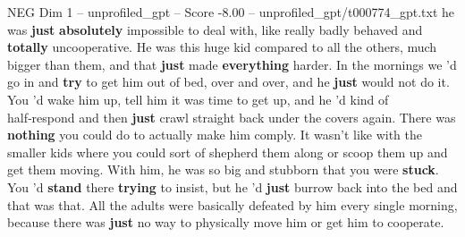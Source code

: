 \begin{textsample}{NEG Dim 1 – unprofiled\_gpt – Score -8.00 – unprofiled\_gpt/t000774\_gpt.txt}  \label{ex:f1_neg_027}
he was \textbf{just} \textbf{absolutely} impossible to deal with, like really badly behaved and \textbf{totally} uncooperative.
He was this huge kid compared to all the others, much bigger than them, and that \textbf{just} made \textbf{everything} harder.
In the mornings we ’d go in and \textbf{try} to get him out of bed, over and over, and he \textbf{just} would not do it.
You ’d wake him up, tell him it was time to get up, and he ’d kind of half‑respond and then \textbf{just} crawl straight back under the covers again.
There was \textbf{nothing} you could do to actually make him comply.
It wasn't like with the smaller kids where you could sort of shepherd them along or scoop them up and get them moving.
With him, he was so big and stubborn that you were \textbf{stuck}.
You ’d \textbf{stand} there \textbf{trying} to insist, but he ’d \textbf{just} burrow back into the bed and that was that.
All the adults were basically defeated by him every single morning, because there was \textbf{just} no way to physically move him or get him to cooperate.

\end{textsample}
